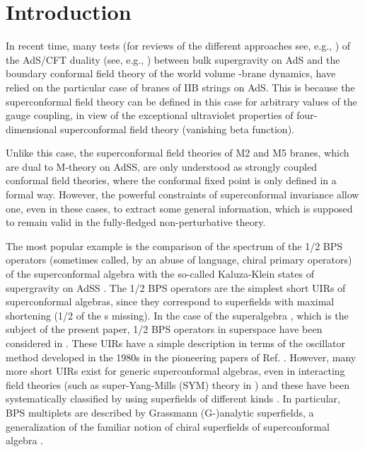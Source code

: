 \documentclass[a4paper,11pt]{article}
\begin{document}
\section{Introduction}\label{intro}
In recent time, many tests (for reviews of the different
approaches see, e.g., \cite{Frrev,Brev,HWrev}) of the AdS/CFT
duality (see, e.g., \cite{AGMOO}) between bulk supergravity on
AdS\coordHE{} and the boundary conformal field theory of the world
volume \coordHE{}-brane dynamics, have relied on the particular case of
\coordHE{} branes of IIB strings on AdS\coordHE{}. This is because the \coordHE{}
superconformal field theory can be defined in this case for
arbitrary values of the gauge coupling, in view of the exceptional
ultraviolet properties of four-dimensional \coordHE{} superconformal
field theory (vanishing beta function).

Unlike this case, the superconformal field theories of M2 and M5
branes, which are dual to M-theory on AdS\coordHE{}S\coordHE{}, are only understood as strongly coupled
conformal field theories, where the conformal fixed point is only
defined in a formal way. However, the powerful constraints of
superconformal invariance allow one, even in these cases, to
extract some general information, which is supposed to remain
valid in the fully-fledged non-perturbative theory.

The most popular example is the comparison \cite{AOY} of the
spectrum of the 1/2 BPS operators (sometimes called, by an abuse
of language, chiral primary operators) of the superconformal
algebra with the so-called Kaluza-Klein states \cite{GvNW} of
\coordHE{} supergravity on AdS\coordHE{}S\coordHE{} \cite{vNAll}.
The 1/2 BPS operators are the simplest short UIRs of
superconformal algebras, since they correspond to superfields with
maximal shortening (1/2 of the \myHighlight{$\theta$}\coordHE{}s missing). In the case of
the superalgebra \coordHE{}, which is the subject of
the present paper, 1/2 BPS operators in superspace have been
considered in \cite{Hproc,FS2}. These UIRs have a simple
description \cite{GvNW,GT} in terms of the oscillator method
developed in the 1980s in the pioneering papers of Ref.
\cite{GunAll}. However, many more short UIRs exist for generic
superconformal algebras, even in interacting field theories (such
as \coordHE{} super-Yang-Mills (SYM) theory in \coordHE{}) and these have
been systematically classified by using superfields of different
kinds \cite{FS1,HHowe}. In particular, BPS multiplets are
described by Grassmann (G-)analytic superfields, a generalization
of the familiar notion of chiral superfields of \coordHE{}
superconformal algebra \coordHE{}.
\end{document}
